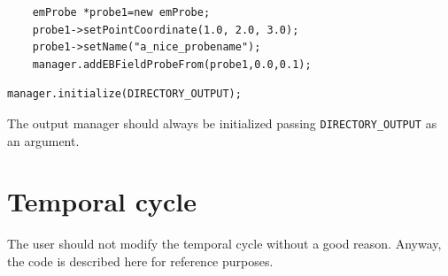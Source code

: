 \documentclass[11pt,a4paper]{report}
\begin{document}
\begin{lstlisting}
	emProbe *probe1=new emProbe;
	probe1->setPointCoordinate(1.0, 2.0, 3.0);
	probe1->setName("a_nice_probename");
	manager.addEBFieldProbeFrom(probe1,0.0,0.1);
\end{lstlisting}

\begin{lstlisting}[backgroundcolor=\color{no_modify}]
	manager.initialize(DIRECTORY_OUTPUT);
\end{lstlisting}
The output manager should always be initialized passing \verb+DIRECTORY_OUTPUT+
as an argument. 

\section{Temporal cycle}
The user should not modify the temporal cycle without a good reason. Anyway, the code is described here for reference purposes.
\end{document}
